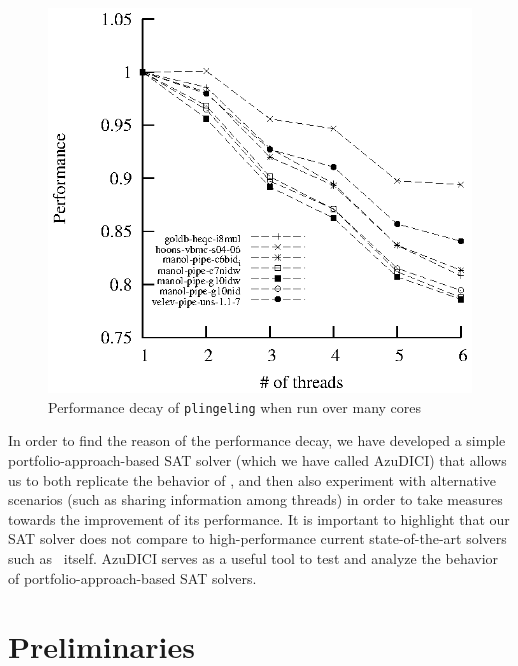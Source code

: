 \documentclass{llncs}
\begin{document}
\begin{figure}[tp]
  \centering
  \includegraphics[scale=1]{plingeling_6cores_speedup}
  \caption{Performance decay of {\tt plingeling} when run over many cores}
  \label{fig:decay}
\end{figure}

In order to find the reason of the performance decay, we have
developed a simple portfolio-approach-based SAT solver (which we have
called AzuDICI) that allows us to both replicate the behavior of
\pling, and then also experiment with alternative scenarios (such as
sharing information among threads) in order to take measures towards
the improvement of its performance. It is important to highlight that
our SAT solver does not compare to high-performance current
state-of-the-art solvers such as \pling\ itself. AzuDICI serves as a
useful tool to test and analyze the behavior of
portfolio-approach-based SAT solvers.


\section{Preliminaries}
\label{sec:preliminaries}
\end{document}
